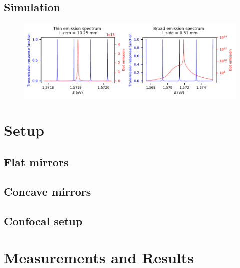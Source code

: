 \cite{noauthor_fabryperot_nodate}
\subsection{Simulation}

\begin{figure}[H]
	\centering
	\includegraphics[width=\linewidth]{figures/plots/fabry-perot/simulation-comparison-dot-fabry-perot-modes}
	\caption{}
	\label{fig:simulation-comparison-dot-fabry-perot-modes}
\end{figure}

\section{Setup}

\subsection{Flat mirrors}


\subsection{Concave mirrors}

\subsection{Confocal setup}

\section{Measurements and Results}

